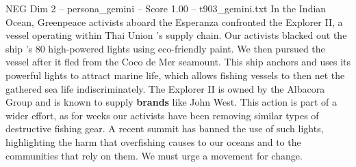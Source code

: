 \begin{textsample}{NEG Dim 2 – persona\_gemini – Score 1.00 – t903\_gemini.txt}  \label{ex:f2_neg_011}
In the Indian Ocean, Greenpeace activists aboard the Esperanza confronted the Explorer II, a vessel operating within Thai Union 's supply chain.
Our activists blacked out the ship 's 80 high-powered lights using eco-friendly paint.
We then pursued the vessel after it fled from the Coco de Mer seamount.
This ship anchors and uses its powerful lights to attract marine life, which allows fishing vessels to then net the gathered sea life indiscriminately.
The Explorer II is owned by the Albacora Group and is known to supply \textbf{brands} like John West.
This action is part of a wider effort, as for weeks our activists have been removing similar types of destructive fishing gear.
A recent summit has banned the use of such lights, highlighting the harm that overfishing causes to our oceans and to the communities that rely on them.
We must urge a movement for change.

\end{textsample}
